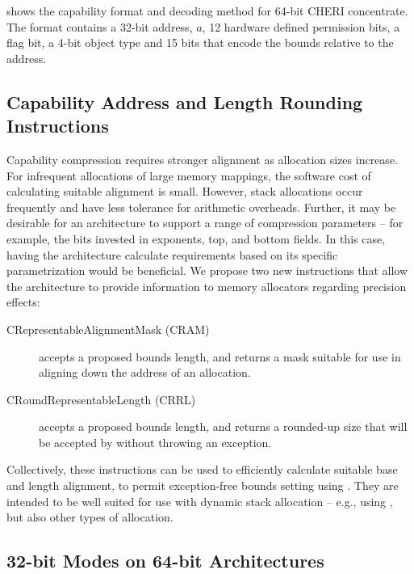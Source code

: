  shows the capability format and decoding method
for 64-bit CHERI concentrate.  The format contains a 32-bit address,
$a$, 12 hardware defined permission bits, a flag bit, a 4-bit object
type and 15 bits that encode the bounds relative to the address.

\subsection{Capability Address and Length Rounding Instructions}
\label{sec:capability-address-and-length-rounding}

Capability compression requires stronger alignment as allocation sizes
increase.
For infrequent allocations of large memory mappings, the software cost of
calculating suitable alignment is small.
However, stack allocations occur frequently and have less tolerance for
arithmetic overheads.
Further, it may be desirable for an architecture to support a range of
compression parameters -- for example, the bits invested in exponents, top,
and bottom fields.
In this case, having the architecture calculate requirements based on its
specific parametrization would be beneficial.
We propose two new instructions that allow the architecture to provide
information to memory allocators regarding precision effects:

\begin{description}
\item[CRepresentableAlignmentMask (CRAM)]  accepts a proposed
  bounds length, and returns a mask suitable for use in aligning down the
  address of an allocation.

\item[CRoundRepresentableLength (CRRL)]  accepts a proposed
  bounds length, and returns a rounded-up size that will be accepted by
   without throwing an exception.
\end{description}

Collectively, these instructions can be used to efficiently calculate
suitable base and length alignment, to permit exception-free bounds setting
using .
They are intended to be well suited for use with dynamic stack allocation --
e.g., using , but also other types of allocation.

\subsection{32-bit Modes on 64-bit Architectures}

